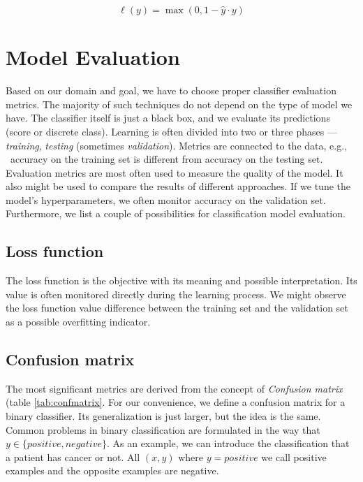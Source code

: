 \begin{equation} \label{eq:hinge}
    \ell(y)=\max(0,1-\hat{y}\cdot y)
\end{equation}

\section{Model Evaluation}
Based on our domain and goal, we have to choose proper classifier evaluation metrics. The majority of such techniques do not depend on the type of model we have. The classifier itself is just a black box, and we evaluate its predictions (score or discrete class).
Learning is often divided into two or three phases --- \emph{training}, \emph{testing} (sometimes \emph{validation}). Metrics are connected to the data, e.g., \ accuracy on the training set is different from accuracy on the testing set. 
Evaluation metrics are most often used to measure the quality of the model. It also might be used to compare the results of different approaches. If we tune the model's hyperparameters, we often monitor accuracy on the validation set. Furthermore, we list a couple of possibilities for classification model evaluation.

\subsection*{Loss function}
The loss function is the objective with its meaning and possible interpretation. Its value is often monitored directly during the learning process. We might observe the loss function value difference between the training set and the validation set as a possible overfitting indicator.

\subsection*{Confusion matrix}
The most significant metrics are derived from the concept of \emph{Confusion matrix} (table \ref{tab:confmatrix}. For our convenience, we define a confusion matrix for a binary classifier. Its generalization is just larger, but the idea is the same. Common problems in binary classification are formulated in the way that $y \in \{positive, negative\}$. As an example, we can introduce the classification that a patient has cancer or not. All $(x,y)$ where $y=positive$ we call positive examples and the opposite examples are negative.


